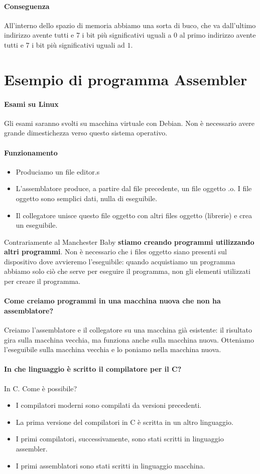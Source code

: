 \documentclass[11pt]{report}
\theoremstyle{definition}
\begin{document}
\paragraph{Conseguenza} All'interno dello spazio di memoria abbiamo una sorta di buco, che va dall'ultimo indirizzo avente tutti e 7 i bit più significativi uguali a $0$ al primo indirizzo avente tutti e 7 i bit più significativi uguali ad $1$.

\section{Esempio di programma Assembler}
\paragraph{Esami su Linux} Gli esami saranno svolti su macchina virtuale con Debian. Non è necessario avere grande dimestichezza verso questo sistema operativo.
\paragraph{Funzionamento}
\begin{itemize}
\item Produciamo un file editor.s
\item L'assemblatore produce, a partire dal file precedente, un file oggetto .o. I file oggetto sono semplici dati, nulla di eseguibile. 
\item Il collegatore unisce questo file oggetto con altri files oggetto (librerie) e crea un eseguibile. 
\end{itemize}
Contrariamente al Manchester Baby \textbf{stiamo creando programmi utilizzando altri programmi}. Non è necessario che i files oggetto siano presenti sul dispositivo dove avvieremo l'eseguibile: quando acquistiamo un programma abbiamo solo ciò che serve per eseguire il programma, non gli elementi utilizzati per creare il programma.
\paragraph{Come creiamo programmi in una macchina nuova che non ha assemblatore?} Creiamo l'assemblatore e il collegatore su una macchina già esistente: il risultato gira sulla macchina vecchia, ma funziona anche sulla macchina nuova. Otteniamo l'eseguibile sulla macchina vecchia e lo poniamo nella macchina nuova. 
\paragraph{In che linguaggio è scritto il compilatore per il C?} In C. Come è possibile? 
\begin{itemize}
\item I compilatori moderni sono compilati da versioni precedenti.
\item La prima versione del compilatori in C è scritta in un altro linguaggio.
\item I primi compilatori, successivamente, sono stati scritti in linguaggio assembler.
\item I primi assemblatori sono stati scritti in linguaggio macchina.
\end{itemize}
\end{document}
